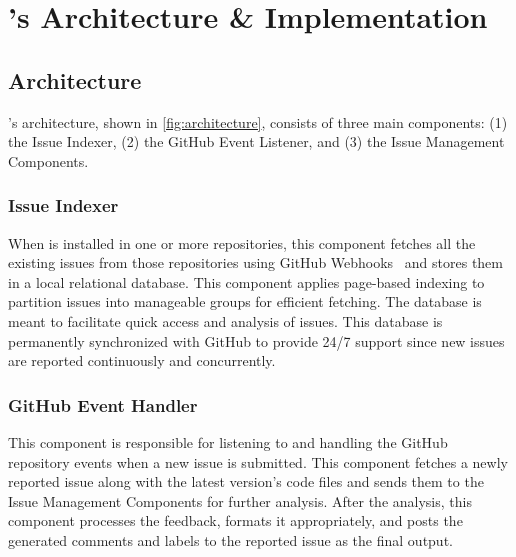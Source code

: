 \section{\toolname’s Architecture \& Implementation}
\label{sec:architecture}

\subsection{Architecture}
\toolname's architecture, shown in \cref{fig:architecture}, consists of three main components: (1) the  Issue Indexer, (2) the GitHub Event Listener, and (3) the Issue Management Components.
\subsubsection{Issue Indexer}
When \toolname is installed in one or more repositories, this component fetches all the existing issues from those repositories using GitHub Webhooks~\cite{webhookDoc} and stores them in a local relational database. This component applies page-based indexing to partition issues into manageable groups for efficient fetching. The database is meant to facilitate quick access and analysis of issues. This database is permanently synchronized with GitHub to provide 24/7 support since new issues are reported continuously and concurrently.
\subsubsection{GitHub Event Handler}
This component is responsible for listening to and handling the GitHub repository events when a new issue is submitted. This component fetches a newly reported issue along with the latest version's code files and sends them to the Issue Management Components for further analysis. After the analysis, this component processes the feedback, formats it appropriately, and posts the generated comments and labels to the reported issue as the final output.

